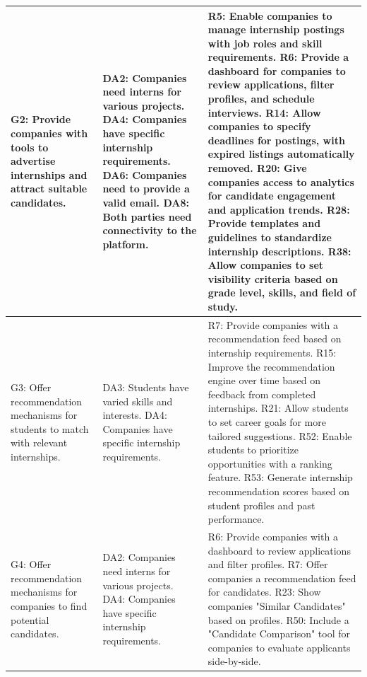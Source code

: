 \begin{longtable}{| p{} | p{} | p{} |}
G2: Provide companies with tools to advertise internships and attract suitable candidates. & DA2: Companies need interns for various projects. \newline DA4: Companies have specific internship requirements. \newline DA6: Companies need to provide a valid email. \newline DA8: Both parties need connectivity to the platform. & R5: Enable companies to manage internship postings with job roles and skill requirements. \newline R6: Provide a dashboard for companies to review applications, filter profiles, and schedule interviews. \newline R14: Allow companies to specify deadlines for postings, with expired listings automatically removed. \newline R20: Give companies access to analytics for candidate engagement and application trends. \newline R28: Provide templates and guidelines to standardize internship descriptions. \newline R38: Allow companies to set visibility criteria based on grade level, skills, and field of study. \\ \hline

G3: Offer recommendation mechanisms for students to match with relevant internships. & DA3: Students have varied skills and interests. \newline DA4: Companies have specific internship requirements. & R7: Provide companies with a recommendation feed based on internship requirements. \newline R15: Improve the recommendation engine over time based on feedback from completed internships. \newline R21: Allow students to set career goals for more tailored suggestions. \newline R52: Enable students to prioritize opportunities with a ranking feature. \newline R53: Generate internship recommendation scores based on student profiles and past performance. \\ \hline

G4: Offer recommendation mechanisms for companies to find potential candidates. & DA2: Companies need interns for various projects. \newline DA4: Companies have specific internship requirements. & R6: Provide companies with a dashboard to review applications and filter profiles. \newline R7: Offer companies a recommendation feed for candidates. \newline R23: Show companies "Similar Candidates" based on profiles. \newline R50: Include a "Candidate Comparison" tool for companies to evaluate applicants side-by-side. \\ \hline


\end{longtable}
